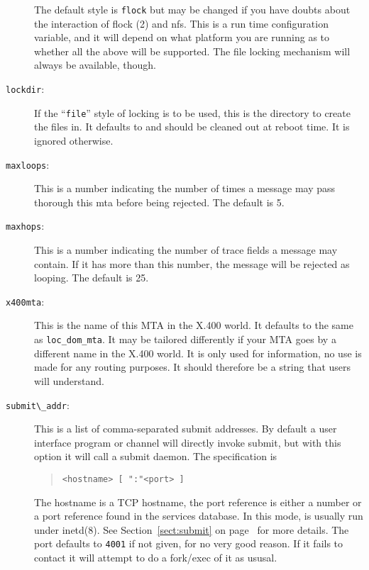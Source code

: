 \begin{description}
The default style is \verb+flock+ but may be changed if you have
doubts about the interaction of \man flock (2) and nfs.
This is a run time configuration variable, and it will depend on what
platform you are running as to whether all the above will be
supported. The file locking mechanism will always be available, though.

\item[\verb+lockdir+:]
If the ``\verb+file+'' style of locking is to be
used, this is the directory to create the files in. It defaults to
 and should be cleaned out at reboot time. It is ignored
otherwise.

\item[\verb|maxloops|:]
This is a number indicating the number of times a
message may pass thorough this mta before being rejected. The default
is 5.

\item[\verb|maxhops|:]
This is a number indicating the number of trace
fields a message may contain. If it has more than this number, the
message will be rejected as looping. The default is 25.

\item[\verb|x400mta|:]
This is the name of this MTA in the X.400 world. It
defaults to the same as \verb|loc_dom_mta|. It may be tailored
differently if your MTA goes by a different name in the X.400 world.
It is only used for information, no use is made for any routing
purposes. It should therefore be a string that users will understand.

\item[\verb|submit\_addr|:]
This is a list of comma-separated submit
addresses. By default a user interface program or channel will
directly invoke submit, but with this option it will call a submit
daemon. The specification is 
\begin{quote}\begin{verbatim}
<hostname> [ ":"<port> ]
\end{verbatim}\end{quote}
The hostname is a TCP hostname, the port reference is either a number
or a port reference found in the services database. In this mode,
 is usually run under \man inetd(8). See
Section~\ref{sect:submit} on page~\pageref{sect:submit} for more
details.  The port defaults to \verb|4001| if not given, for no very
good reason. If it fails to contact  it will attempt to do
a fork/exec of it as ususal.


\end{description}
